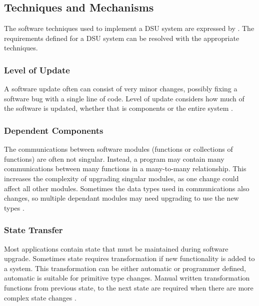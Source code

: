 \subsection{Techniques and Mechanisms}
The software techniques used to implement a DSU system are expressed by \textcite{mlinaricChallengesDynamicSoftware2020}. The requirements defined for a DSU system can be resolved with the appropriate techniques.


\subsubsection{Level of Update}
A software update often can consist of very minor changes, possibly fixing a software bug with a single line of code. Level of update considers how much of the software is updated, whether that is components or the entire system \autocite{seifzadehSurveyDynamicSoftware2013}.

\subsubsection{Dependent Components}
The communications between software modules (functions or collections of functions) are often not singular. Instead, a program may contain many communications between many functions in a many-to-many relationship. This increases the complexity of upgrading singular modules, as one change could affect all other modules. Sometimes the data types used in communications also changes, so multiple dependant modules may need upgrading to use the new types \autocite{mlinaricChallengesDynamicSoftware2020}.





\subsubsection{State Transfer}
Most applications contain state that must be maintained during software upgrade. Sometimes state requires transformation if new functionality is added to a system.
This transformation can be either automatic or programmer defined, automatic is suitable for primitive type changes. Manual written transformation functions from previous state, to the next state are required when there are more complex state changes \autocite{seifzadehSurveyDynamicSoftware2013}.

